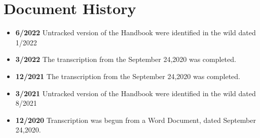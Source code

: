 \section{Document History}
	\begin{itemize}
		\item{{\bfseries 6/2022} Untracked version of the Handbook were identified in the wild dated 1/2022}
		\item{{\bfseries 3/2022} The transcription from the September 24,2020 was completed.}
		\item{{\bfseries 12/2021} The transcription from the September 24,2020 was completed.}
		\item{{\bfseries 3/2021} Untracked version of the Handbook were identified in the wild dated 8/2021}
		\item{{\bfseries 12/2020} Transcription was begun from a Word Document, dated September 24,2020.}
	\end{itemize}